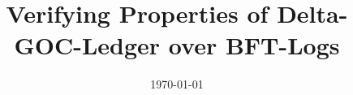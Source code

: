 \documentclass[a4paper, 10pt, oneside]{memoir}
\title{Verifying Properties of Delta-GOC-Ledger over BFT-Logs}
\date{\today{}}
\begin{document}
\thesisfront
\maketitle
\pagestyle{thesis}



\thesistoc
\thesismain



\thesisappendix
\thesisbib
\begin{appendices}
\end{appendices}
\thesisback
\end{document}
